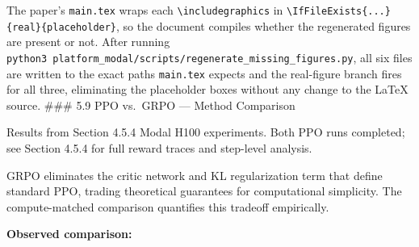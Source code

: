 \documentclass[
  american,
  11pt,
  a4paper,
  oneside]{report}
\begin{document}
The paper's \texttt{main.tex} wraps each
\texttt{\textbackslash{}includegraphics} in
\texttt{\textbackslash{}IfFileExists\{...\}\{real\}\{placeholder\}}, so
the document compiles whether the regenerated figures are present or
not. After running
\texttt{python3\ platform_modal/scripts/regenerate\_missing\_figures.py}, all six files
are written to the exact paths \texttt{main.tex} expects and the
real-figure branch fires for all three, eliminating the placeholder
boxes without any change to the LaTeX source. \#\#\# 5.9 PPO vs.~GRPO
--- Method Comparison

Results from Section 4.5.4 Modal H100 experiments. Both PPO runs
completed; see Section 4.5.4 for full reward traces and step-level
analysis.

GRPO eliminates the critic network and KL regularization term that
define standard PPO, trading theoretical guarantees for computational
simplicity. The compute-matched comparison quantifies this tradeoff
empirically.

\textbf{Observed comparison:}
\end{document}
